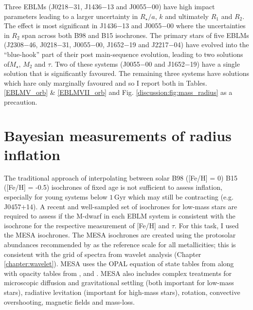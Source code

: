 Three EBLMs (J0218$-$31, J1436$-$13 and J0055$-$00) have high impact parameters leading to a larger uncertainty in $R_\star / a$, $k$ and ultimately $R_1$ and $R_2$. The effect is most significant in J1436$-$13 and J0055$-$00 where the uncertainties in $R_2$ span across both B98 and B15 isochrones. The primary stars of five EBLMs (J2308$-$46, J0218$-$31, J0055$-$00, J1652$-$19 and J2217$-$04) have evolved into the ``blue-hook'' part of their post main-sequence evolution, leading to two solutions of$M_\star$, $M_2$ and $\tau$. Two of these systems (J0055$-$00 and J1652$-$19) have a single solution that is significantly favoured. The remaining three systems have solutions which hare only marginally favoured and so I report both in Tables. \ref{EBLMV_orb} \& \ref{EBLMVII_orb} and Fig. \ref{discussion:fig:mass_radius} as a precaution.



%
%
\section{Bayesian measurements of radius inflation}\label{discuss:inflation}

The traditional approach of interpolating between solar B98 ([Fe/H] = 0) B15 ([Fe/H] = -0.5) isochrones of fixed age is not sufficient to assess inflation, especially for young systems below $1\,$Gyr which may still be contracting (e.g. J0457$+$14). A recent and well-sampled set of isochrones for low-mass stars are required to assess if the M-dwarf in each EBLM system is consistent with the isochrone for the respective measurement of [Fe/H] and $\tau$. For this task, I used the MESA isochrones. The MESA isochrones are created using the protosolar abundances recommended by \citet{2009ARA&A..47..481A} as the reference scale for all metallicities; this is consistent with the grid of spectra from wavelet analysis (Chapter \ref{chapter:wavelet}). MESA uses the OPAL equation of state tables from \citet{2002ApJ...576.1064R} along with opacity tables from \citet{2008ApJS..174..504F}, \citet{2011MNRAS.413.1828Y} and \citet{2010MolPh.108.2265F}. MESA also includes complex treatments for microscopic diffusion and gravitational settling (both important for low-mass stars), radiative levitation (important for high-mass stars), rotation, convective overshooting, magnetic fields and mass-loss. 

